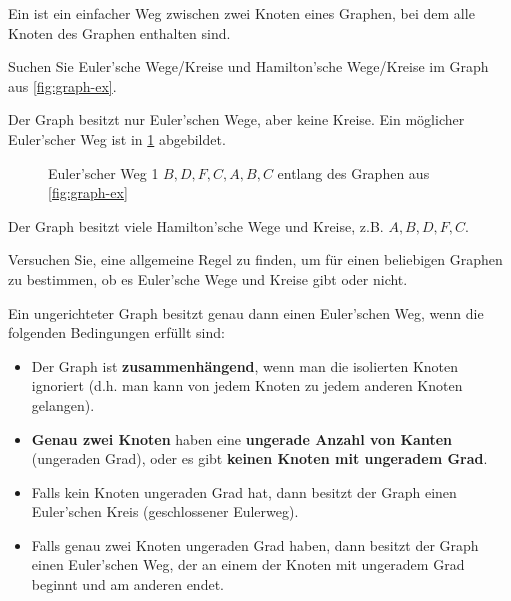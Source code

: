 Ein  ist ein einfacher Weg zwischen zwei Knoten eines Graphen, bei dem alle Knoten des Graphen enthalten sind.

\begin{myexercise}
Suchen Sie Euler'sche Wege/Kreise und Hamilton'sche Wege/Kreise im Graph aus \cref{fig:graph-ex}.
\begin{myanswer}
Der Graph besitzt nur Euler'schen Wege, aber keine Kreise. Ein möglicher Euler'scher Weg ist in \cref{fig:graph-ex-weg-eul-1} abgebildet.
\begin{figure}[H]
    \centering
    \caption{Euler'scher Weg 1 $B,D,F,C,A,B,C$ entlang des Graphen aus \cref{fig:graph-ex}}
    \label{fig:graph-ex-weg-eul-1}
\end{figure}
\end{myanswer}
Der Graph besitzt viele Hamilton'sche Wege und Kreise, z.B. $A,B,D,F,C$.
\end{myexercise}

\begin{mychallenge}\label{myBox:euler-allg}
Versuchen Sie, eine allgemeine Regel zu finden, um für einen beliebigen Graphen zu bestimmen, ob es Euler'sche Wege und Kreise gibt oder nicht.
\begin{myanswer}
Ein ungerichteter Graph besitzt genau dann einen Euler'schen Weg, wenn die folgenden Bedingungen erfüllt sind:
\begin{itemize}
\item Der Graph ist \textbf{zusammenhängend}, wenn man die isolierten Knoten ignoriert (d.h. man kann von jedem Knoten zu jedem anderen Knoten gelangen).
\item \textbf{Genau zwei Knoten} haben eine \textbf{ungerade Anzahl von Kanten} (ungeraden Grad), oder es gibt \textbf{keinen Knoten mit ungeradem Grad}.
\item Falls kein Knoten ungeraden Grad hat, dann besitzt der Graph einen Euler'schen Kreis (geschlossener Eulerweg).
\item Falls genau zwei Knoten ungeraden Grad haben, dann besitzt der Graph einen Euler'schen Weg, der an einem der Knoten mit ungeradem Grad beginnt und am anderen endet.
\end{itemize}
\end{myanswer}
\end{mychallenge}

